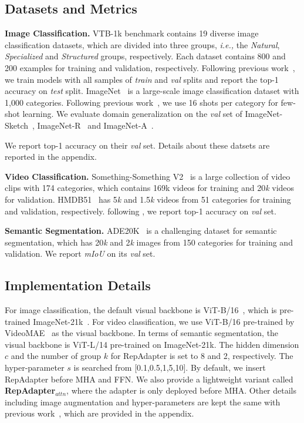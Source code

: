  \subsection{Datasets and Metrics}
  \textbf{Image Classification.} VTB-1k benchmark contains 19 diverse image classification datasets, which are divided into three groups, \emph{i.e.,} the \textit{Natural}, \textit{Specialized} and \textit{Structured} groups, respectively. Each dataset contains 800 and 200 examples  for training and validation, respectively. Following previous work~\cite{vpt,noah}, we train models  with all samples of \textit{train} and \textit{val} splits and report the  top-1 accuracy  on \textit{test} split. ImageNet~\cite{imagenet} is a large-scale image classification dataset with 1,000 categories.  Following previous work~\cite{coop,cocoop}, we use 16 shots per category for few-shot learning.  We evaluate domain generalization on  the \textit{val} set of ImageNet-Sketch~\cite{imagenets}, ImageNet-R~\cite{imagenetr} and ImageNet-A~\cite{imageneta}.   

 We report top-1 accuracy on their \textit{val} set. Details about these datsets are reported in the appendix.

  \textbf{Video Classification.}  Something-Something V2~\cite{ssv2} is a large collection of video clips with 174 categories, which contains 169k videos for training and 20\textit{k} videos for validation.   HMDB51~\cite{hmdb} has  5\textit{k} and 1.5\textit{k} videos from 51 categories for training and validation, respectively. following \cite{adaptformer}, we report top-1 accuracy on \textit{val} set.

   \textbf{Semantic Segmentation.} ADE20K~\cite{ade20k} is a challenging dataset for semantic segmentation, which has 20\textit{k} and 2\textit{k} images from 150 categories for training and validation. We report \textit{mIoU} on its \textit{val} set.

 \subsection{Implementation Details} For image classification, the default visual backbone is ViT-B/16~\cite{vit}, which is pre-trained ImageNet-21k~\cite{imagenet}.  For video classification, we use ViT-B/16 pre-trained by VideoMAE~\cite{videomae} as the visual backbone.  In terms of  semantic segmentation, the visual backbone is ViT-L/14 pre-trained on ImageNet-21k. The hidden dimension $c$  and the number of group $k$ for RepAdapter is set to 8 and 2, respectively. The hyper-parameter $s$   is  searched from [0.1,0.5,1,5,10]. By default, we insert RepAdapter before MHA and FFN. We also provide a lightweight variant called \textbf{RepAdapter$_{attn}$},  where the adapter is only deployed before MHA. Other  details including image augmentation and hyper-parameters  are kept the same with previous work~\cite{coop,vpt,adaptformer,noah}, which are provided in the appendix.

